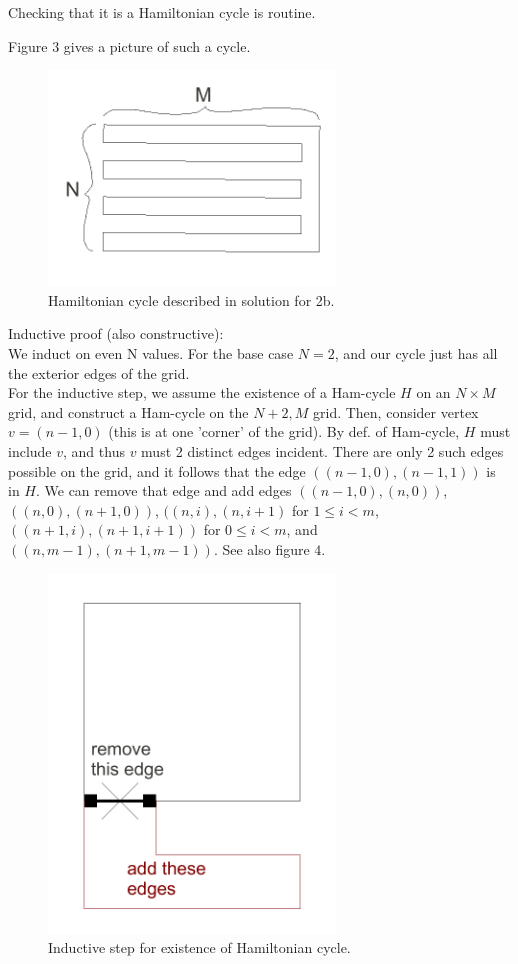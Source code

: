 \documentclass[12pt,twoside]{article}
\begin{document}
\begin{problem}{20}
\begin{enumerate}
{Checking that it is a Hamiltonian cycle is routine.

Figure $3$ gives a picture of such a cycle.\\

\begin{figure}[p]
\label{hamcy}
\centerline{\includegraphics[width = 3.00in]{hamCycle}}
\caption{Hamiltonian cycle described in solution for 2b.}
\end{figure}

Inductive proof (also constructive):\\
We induct on even N values.  For the base case $N=2$, and our cycle just has all the exterior edges of the grid.\\
For the inductive step, we assume the existence of a Ham-cycle $H$ on an $N \times M$ grid, and construct a Ham-cycle on the $N+2,M$ grid.  Then, consider vertex $v=(n-1,0)$ (this is at one 'corner' of the grid).  By def. of Ham-cycle, $H$ must include $v$, and thus $v$ must 2 distinct edges incident.  There are only 2 such edges possible on the grid, and it follows that the edge $((n-1,0),(n-1,1))$ is in $H$.  We can remove that edge and add edges $((n-1,0),(n,0))$, $((n,0),(n+1,0))$, $((n,i),(n,i+1)$ for $1\le i <m$, $((n+1,i),(n+1,i+1))$ for $0 \le i < m$, and $((n,m-1),(n+1,m-1))$.  See also figure $4$.\\

\begin{figure}[p]
\label{hamind}
\centerline{\includegraphics[width = 3.00in]{p2induction}}
\caption{Inductive step for existence of Hamiltonian cycle.}
\end{figure}

}
\end{enumerate}
\end{problem}
\end{document}
